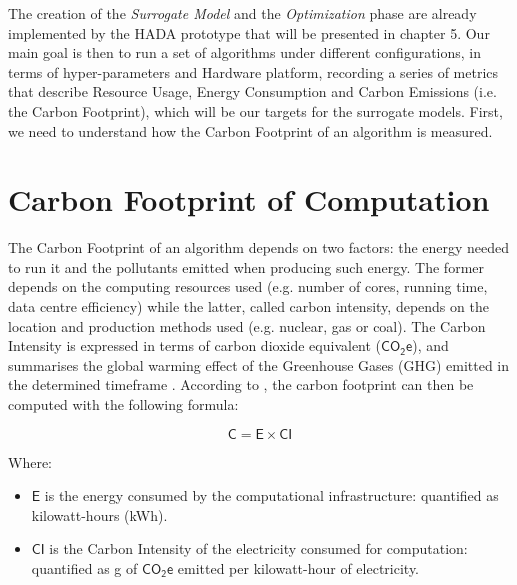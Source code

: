 \documentclass[a4paper,singleside,12pt]{report} %
\begin{document}
The creation of the \textit{Surrogate Model} and the \textit{Optimization} phase are already implemented by the HADA prototype that
will be presented in chapter 5. Our main goal is then to run a set of algorithms under different configurations, in terms of hyper-parameters and 
Hardware platform, recording a series of metrics that describe Resource Usage, Energy Consumption and Carbon Emissions (i.e. the Carbon Footprint), which will be
our targets for the surrogate models. First, we need to understand how the Carbon Footprint of an algorithm is measured.

\section{Carbon Footprint of Computation}

The Carbon Footprint of an algorithm depends on two factors: the energy needed to run it and the pollutants emitted when producing 
such energy. The former depends on the computing resources used (e.g. number of cores, running time, data centre efficiency) 
while the latter, called carbon intensity, depends on the location and production methods used (e.g. nuclear, gas or coal). 
The Carbon Intensity is expressed in terms of carbon dioxide equivalent ($\mathsf{CO_2e}$), and summarises the global warming 
effect of the Greenhouse Gases (GHG) emitted in the determined timeframe \cite{GreenAlgorithms}. According to \cite{courty2024codecarbon}, the carbon footprint can then 
be computed with the following formula:

\begin{equation}
    \mathsf{C} = \mathsf{E} \times \mathsf{CI}
\end{equation}

Where:

\begin{itemize}
    \item $\mathsf{E}$ is the energy consumed by the computational infrastructure: quantified as kilowatt-hours (kWh).
    \item $\mathsf{CI}$ is the Carbon Intensity of the electricity consumed for computation: quantified as g of \(\mathsf{CO_2e}\) 
    emitted per kilowatt-hour of electricity.
\end{itemize}
\end{document}
